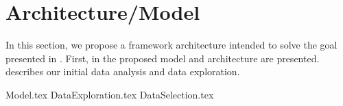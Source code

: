 \chapter{Architecture/Model}
\label{section:Architecture}

In this section, we propose a framework architecture intended to solve the goal presented in .
First, in  the proposed model and architecture are presented.
 describes our initial data analysis and data exploration.

{Model.tex}
{DataExploration.tex}
{DataSelection.tex}

